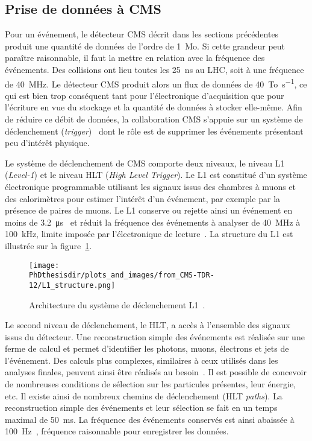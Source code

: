 \subsection{Prise de données à CMS}\label{chapter-LHC-section-CMS-subsec-data_taking}
Pour un événement, le détecteur CMS décrit dans les sections précédentes produit une quantité de données de l'ordre de \SI{1}{\mega o}.
Si cette grandeur peut paraître raisonnable, il faut la mettre en relation avec la fréquence des événements.
Des collisions ont lieu toutes les \SI{25}{\nano\second} au LHC, soit à une fréquence de \SI{40}{\mega\hertz}.
Le détecteur CMS produit alors un flux de données de \SI{40}{\tera o.\second^{-1}}, ce qui est bien trop conséquent tant pour l'électronique d'acquisition que pour l'écriture en vue du stockage et la quantité de données à stocker elle-même.
Afin de réduire ce débit de données, la collaboration CMS s'appuie sur un système de déclenchement (\emph{trigger})~\cite{cms_paper,CERN-LHCC-2000-038,CERN-LHCC-2002-026,CMS-TRG-12-001,CMS-TDR-12} dont le rôle est de supprimer les événements présentant peu d'intérêt physique.
\par Le système de déclenchement de CMS comporte deux niveaux, le niveau \og L1 \fg{} (\emph{Level-1}) et le niveau \og HLT \fg{} (\emph{High Level Trigger}).
Le L1 est constitué d'un système électronique programmable utilisant les signaux issus des chambres à muons et des calorimètres pour estimer l'intérêt d'un événement, par exemple par la présence de paires de muons.
Le L1 conserve ou rejette ainsi un événement en moins de \SI{3.2}{\micro\second}~\cite{cms_paper} et réduit la fréquence des événements à analyser de \SI{40}{\mega\hertz} à \SI{100}{\kilo\hertz}, limite imposée par l'électronique de lecture~\cite{CMS-TRG-12-001}.
La structure du L1 est illustrée sur la figure~\ref{fig-chapter-LHC-section-CMS-subsec-data_taking-cms_paper-fig_8-1}.
\begin{figure}[h]
\centering
\texttt{[image: \\PhDthesisdir/plots\_and\_images/from\_CMS-TDR-12/L1\_structure.png]}
\caption[Architecture du système de déclenchement L1.]{Architecture du système de déclenchement L1~\cite{CMS-TDR-12}.}
\label{fig-chapter-LHC-section-CMS-subsec-data_taking-cms_paper-fig_8-1}
\end{figure}
\par Le second niveau de déclenchement, le HLT, a accès à l'ensemble des signaux issus du détecteur.
Une reconstruction simple des événements est réalisée sur une ferme de calcul et permet d'identifier les photons, muons, électrons et jets de l'événement.
Des calculs plus complexes, similaires à ceux utilisés dans les analyses finales, peuvent ainsi être réalisés au besoin~\cite{cms_paper}.
Il est possible de concevoir de nombreuses conditions de sélection sur les particules présentes, leur énergie, etc.
Il existe ainsi de nombreux chemins de déclenchement (HLT \emph{paths}).
La reconstruction simple des événements et leur sélection se fait en un temps maximal de \SI{50}{\milli\second}.
La fréquence des événements conservés est ainsi abaissée à \SI{100}{\hertz}~\cite{cms_paper,CMS-TRG-12-001}, fréquence raisonnable pour enregistrer les données.